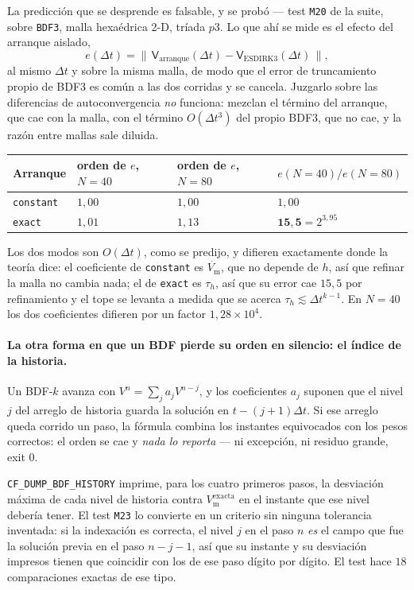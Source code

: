 \documentclass[11pt,a4paper]{article}
\newcommand{\code}[1]{\texttt{\small #1}}
\newcommand{\Vm}{V_{\text{m}}}
\begin{document}
La predicción que se desprende es falsable, y se probó --- test \code{M20} de la suite,
sobre \code{BDF3}, malla hexaédrica 2-D, tríada $p3$. Lo que ahí se mide es el efecto del
arranque aislado,
\begin{equation}
  e(\Delta t) = \bigl\|\,\mathsf{V}_{\text{arranque}}(\Delta t)
  - \mathsf{V}_{\text{ESDIRK3}}(\Delta t)\,\bigr\|,
  \label{eq:startup-effect}
\end{equation}
al mismo $\Delta t$ y sobre la misma malla, de modo que el error de truncamiento propio de
BDF3 es común a las dos corridas y se cancela. Juzgarlo sobre las diferencias de
autoconvergencia \emph{no} funciona: mezclan el término del arranque, que cae con la malla,
con el término $O(\Delta t^3)$ del propio BDF3, que no cae, y la razón entre mallas sale
diluida.
\begin{center}
\begin{tabular}{@{}llll@{}}
\toprule
Arranque & orden de $e$, $N=40$ & orden de $e$, $N=80$ & $e(N{=}40)/e(N{=}80)$ \\
\midrule
\code{constant} & $1{,}00$ & $1{,}00$ & $1{,}00$ \\
\code{exact}    & $1{,}01$ & $1{,}13$ & $\mathbf{15{,}5}=2^{3{,}95}$ \\
\bottomrule
\end{tabular}
\end{center}
Los dos modos son $O(\Delta t)$, como se predijo, y difieren exactamente donde la teoría
dice: el coeficiente de \code{constant} es $\dot{\Vm}$, que no depende de $h$, así que
refinar la malla no cambia nada; el de \code{exact} es $\tau_h$, así que su error cae $15{,}5$
por refinamiento y el tope se levanta a medida que se acerca $\tau_h\lesssim\Delta t^{k-1}$.
En $N=40$ los dos coeficientes difieren por un factor $1{,}28\times10^{4}$.

\paragraph{La otra forma en que un BDF pierde su orden en silencio: el índice de la historia.}
Un BDF-$k$ avanza con $V^n=\sum_j a_j V^{n-j}$, y los coeficientes $a_j$ suponen que el nivel
$j$ del arreglo de historia guarda la solución en $t-(j+1)\Delta t$. Si ese arreglo queda
corrido un paso, la fórmula combina los instantes equivocados con los pesos correctos: el orden
se cae y \emph{nada lo reporta} --- ni excepción, ni residuo grande, exit $0$.

\code{CF\_DUMP\_BDF\_HISTORY} imprime, para los cuatro primeros pasos, la desviación máxima de
cada nivel de historia contra $\Vm^{\text{exacta}}$ en el instante que ese nivel debería tener.
El test \code{M23} lo convierte en un criterio sin ninguna tolerancia inventada: si la
indexación es correcta, el nivel $j$ en el paso $n$ \emph{es} el campo que fue la solución
previa en el paso $n-j-1$, así que su instante y su desviación impresos tienen que coincidir
con los de ese paso dígito por dígito. El test hace $18$ comparaciones exactas de ese tipo.
\end{document}
